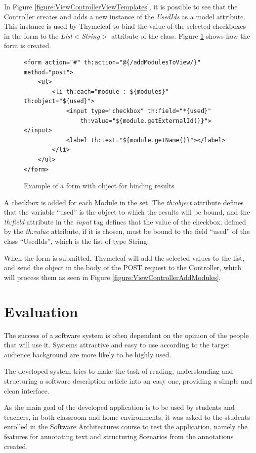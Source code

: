 \documentclass{llncs}
\begin{document}
In Figure \ref{figure:ViewControllerViewTemplates}, it is possible to see that the Controller creates and adds a new instance of the \textit{UsedIds} as a model attribute. This instance is used by Thymeleaf to bind the value of the selected checkboxes in the form to the \textit{List$<$String$>$} attribute of the class. Figure \ref{figure:viewFormBindingResult} shows how the form is created.
\begin{figure}
\lstset{style=customhtml}
\begin{lstlisting}
<form action="#" th:action="@{/addModulesToView/}" method="post">
	<ul>
		<li th:each="module : ${modules}" th:object="${used}">
			<input type="checkbox" th:field="*{used}" 
				th:value="${module.getExternalId()}"></input>
			<label th:text="${module.getName()}"></label>
		</li>
	</ul>
</form>
\end{lstlisting}
\caption{Example of a form with object for binding results}
\label{figure:viewFormBindingResult}
\end{figure}
A checkbox is added for each Module in the set. The \textit{th:object} attribute defines that the variable ``used'' is the object to which the results will be bound, and the \textit{th:field} attribute in the \textit{input} tag defines that the value of the checkbox, defined by the \textit{th:value} attribute, if it is chosen, must be bound to the field ``used'' of the class ``UsedIds'', which is the list of type String.

When the form is submitted, Thymeleaf will add the selected values to the list, and send the object in the body of the POST request to the Controller, which will process them as seen in Figure \ref{figure:ViewControllerAddModules}.


\section{Evaluation}
\label{evaluation}

The success of a software system is often dependent on the opinion of the people that will use it. Systems attractive and easy to use according to the target audience background are more likely to be highly used.

The developed system tries to make the task of reading, understanding and structuring a software description article into an easy one, providing a simple and clean interface.

As the main goal of the developed application is to be used by students and teachers, in both classroom and home environments, it was asked to the students enrolled in the Software Architectures course to test the application, namely the features for annotating text and structuring Scenarios from the annotations created.
\end{document}
